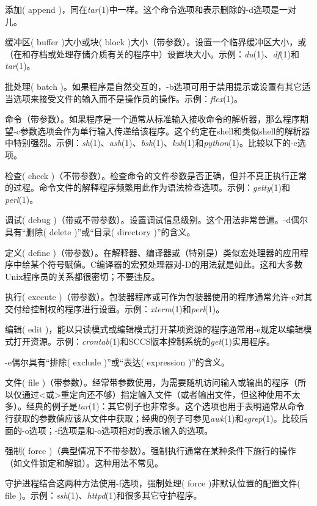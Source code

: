 \documentclass[12pt,oneside]{book}
\begin{document}
\begin{common-format}
\begin{description}
添加( append )，同在\textit{tar}(1)中一样。这个命令选项和表示删除的-d选项是一对儿。
\item[-b] 缓冲区( buffer )大小或块( block )大小（带参数）。设置一个临界缓冲区大小，或（在和存档或处理存储介质有关的程序中）设置块大小。示例：\textit{du}(1)、\textit{df}(1)和\textit{tar}(1)。

批处理( batch )。如果程序是自然交互的，-b选项可用于禁用提示或设置有其它适当选项来接受文件的输入而不是操作员的操作。示例：\textit{flex}(1)。
\item[-c] 命令（带参数）。如果程序是一个通常从标准输入接收命令的解析器，那么程序期望-c参数选项会作为单行输入传递给该程序。这个约定在shell和类似shell的解析器中特别强烈。示例：\textit{sh}(1)、\textit{ash}(1)、\textit{bsh}(1)、\textit{ksh}(1)和\textit{python}(1)。比较以下的-e选项。

检查( check )（不带参数）。检查命令的文件参数是否正确，但并不真正执行正常的过程。命令文件的解释程序频繁用此作为语法检查选项。示例：\textit{getty}(1)和\textit{perl}(1)。
\item[-d] 调试( debug )（带或不带参数）。设置调试信息级别。这个用法非常普遍。-d偶尔具有“删除( delete )”或“目录( directory )”的含义。
\item[-D] 定义( define )（带参数）。在解释器、编译器或（特别是）类似宏处理器的应用程序中给某个符号赋值。C编译器的宏预处理器对-D的用法就是如此。这和大多数Unix程序员的关系都很密切；不要违反。
\item[-e] 执行( execute )（带参数）。包装器程序或可作为包装器使用的程序通常允许-e对其交付给控制权的程序进行设置。示例：\textit{xterm}(1)和\textit{perl}(1)。

编辑( edit )，能以只读模式或编辑模式打开某项资源的程序通常用-e规定以编辑模式打开资源。示例：\textit{crontab}(1)和SCCS版本控制系统的\textit{get}(1)实用程序。

-e偶尔具有“排除( exclude )”或“表达( expression )”的含义。

\item[-f] 文件( file )（带参数）。经常带参数使用，为需要随机访问输入或输出的程序（所以仅通过<或>重定向还不够）指定输入文件（或者输出文件，但这种使用不太多）。经典的例子是\textit{tar}(1)：其它例子也非常多。这个选项也用于表明通常从命令行获取的参数值应该从文件中获取；经典的例子可参见\textit{awk}(1)和\textit{egrep}(1)。比较后面的-o选项；-f选项是和-o选项相对的表示输入的选项。

强制( force )（典型情况下不带参数）。强制执行通常在某种条件下施行的操作（如文件锁定和解锁）。这种用法不常见。

守护进程结合这两种方法使用-f选项，强制处理( force )非默认位置的配置文件( file )。示例：\textit{ssh}(1)、\textit{httpd}(1)和很多其它守护程序。


\end{description}
\end{common-format}
\end{document}
